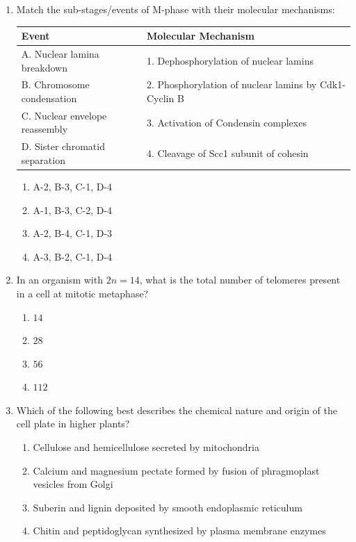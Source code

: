 \documentclass[11pt,a4paper]{article}
\begin{document}
\begin{enumerate}[label=\textbf{\arabic*.}, leftmargin=*]
\item Match the sub-stages/events of M-phase with their molecular mechanisms:
\begin{center}
\begin{tabular}{|l|l|}
\hline
\textbf{Event} & \textbf{Molecular Mechanism} \\
\hline
A. Nuclear lamina breakdown & 1. Dephosphorylation of nuclear lamins \\
B. Chromosome condensation & 2. Phosphorylation of nuclear lamins by Cdk1-Cyclin B \\
C. Nuclear envelope reassembly & 3. Activation of Condensin complexes \\
D. Sister chromatid separation & 4. Cleavage of Scc1 subunit of cohesin \\
\hline
\end{tabular}
\end{center}
\begin{enumerate}[label=(\alph*)]
    \item A-2, B-3, C-1, D-4
    \item A-1, B-3, C-2, D-4
    \item A-2, B-4, C-1, D-3
    \item A-3, B-2, C-1, D-4
\end{enumerate}

\item In an organism with $2n = 14$, what is the total number of telomeres present in a cell at mitotic metaphase?
\begin{enumerate}[label=(\alph*)]
    \item $14$
    \item $28$
    \item $56$
    \item $112$
\end{enumerate}

\item Which of the following best describes the chemical nature and origin of the cell plate in higher plants?
\begin{enumerate}[label=(\alph*)]
    \item Cellulose and hemicellulose secreted by mitochondria
    \item Calcium and magnesium pectate formed by fusion of phragmoplast vesicles from Golgi
    \item Suberin and lignin deposited by smooth endoplasmic reticulum
    \item Chitin and peptidoglycan synthesized by plasma membrane enzymes
\end{enumerate}


\end{enumerate}
\end{document}
